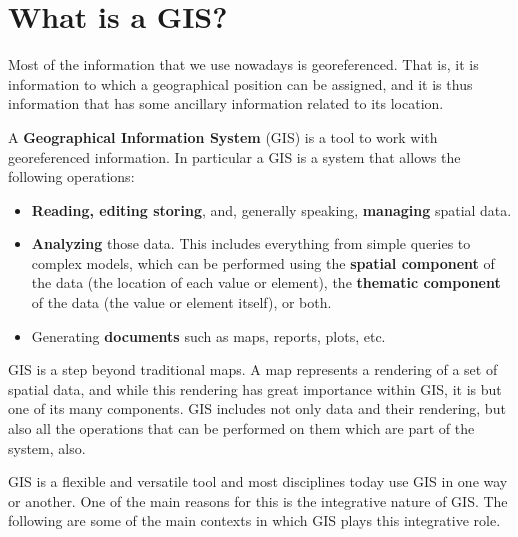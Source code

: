 
\chapter{What is a GIS?}

\pagestyle{fancy}

Most of the information that we use nowadays is georeferenced. That is, it is information to which a geographical position can be assigned, and it is thus information that has some ancillary information related to its location.

A \textbf{Geographical Information System} (GIS) is a tool to work with georeferenced information. In particular a GIS is a system that allows the following operations:

\begin{itemize}
	\item \textbf{Reading, editing storing}, and, generally speaking, \textbf{managing} spatial data.
	\item \textbf{Analyzing} those data. This includes everything from simple queries to complex models, which can be performed using the \textbf{spatial component} of the data (the location of each value or element), the \textbf{thematic component} of the data (the value or element itself), or both.
	\item Generating \textbf{documents} such as maps, reports, plots, etc.
\end{itemize}


GIS is a step beyond traditional maps. A map represents a rendering of a set of spatial data, and while this rendering has great importance within GIS, it is but one of its many components. GIS includes not only data and their rendering, but also all the operations that can be performed on them which are part of the system, also.

GIS is a flexible and versatile tool and most disciplines today use GIS in one way or another. One of the main reasons for this is the integrative nature of GIS. The following are some of the main contexts in which GIS plays this integrative role.



